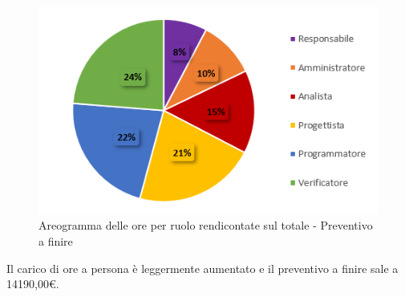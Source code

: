 \begin{figure}[H]
  \centering
  \includegraphics[scale=0.9]{immagini/ore_ruolo_preventivo_finire_RTB.png}
  \caption{Areogramma delle ore per ruolo rendicontate sul totale - Preventivo a finire}
\end{figure}

Il carico di ore a persona è leggermente aumentato e il preventivo a finire sale a 14190,00€.


